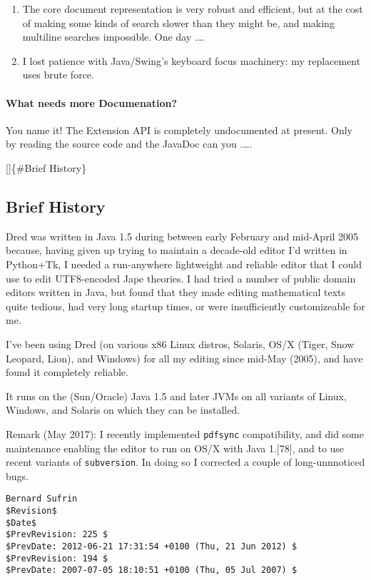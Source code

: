 \documentclass[
]{article}
\providecommand{\tightlist}{%
  \setlength{\itemsep}{0pt}\setlength{\parskip}{0pt}}
\begin{document}
\begin{enumerate}
\def\labelenumi{\arabic{enumi}.}
\tightlist
\item
  The core document representation is very robust and efficient, but at
  the cost of making some kinds of search slower than they might be, and
  making multiline searches impossible. One day .\ldots{}
\item
  I lost patience with Java/Swing's keyboard focus machinery: my
  replacement uses brute force.
\end{enumerate}

\hypertarget{what-needs-more-documenation}{%
\paragraph{What needs more
Documenation?}\label{what-needs-more-documenation}}

You name it! The Extension API is completely undocumented at present.
Only by reading the source code and the JavaDoc can you .\ldots.

{[}{]}\{\#Brief History\}

\hypertarget{brief-history}{%
\subsection{Brief History}\label{brief-history}}

Dred was written in Java 1.5 during between early February and mid-April
2005 because, having given up trying to maintain a decade-old editor I'd
written in Python+Tk, I needed a run-anywhere lightweight and reliable
editor that I could use to edit UTF8-encoded Jape theories. I had tried
a number of public domain editors written in Java, but found that they
made editing mathematical texts quite tedious, had very long startup
times, or were insufficiently customizeable for me.

I've been using Dred (on various x86 Linux distros, Solaris, OS/X
(Tiger, Snow Leopard, Lion), and Windows) for all my editing since
mid-May (2005), and have found it completely reliable.

It runs on the (Sun/Oracle) Java 1.5 and later JVMs on all variants of
Linux, Windows, and Solaris on which they can be installed.

Remark (May 2017): I recently implemented \texttt{pdfsync}
compatibility, and did some maintenance enabling the editor to run on
OS/X with Java 1.{[}78{]}, and to use recent variants of
\texttt{subversion}. In doing so I corrected a couple of long-unnnoticed
bugs.

\begin{verbatim}
Bernard Sufrin
$Revision$
$Date$
$PrevRevision: 225 $
$PrevDate: 2012-06-21 17:31:54 +0100 (Thu, 21 Jun 2012) $
$PrevRevision: 194 $
$PrevDate: 2007-07-05 18:10:51 +0100 (Thu, 05 Jul 2007) $
\end{verbatim}
\end{document}
